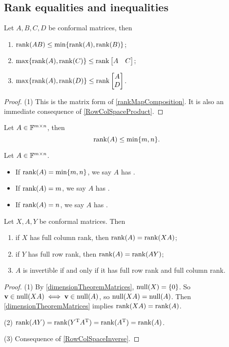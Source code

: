 \subsection{Rank equalities and inequalities}
\begin{proposition} \label{rankMultiplication}
Let $A,B,C,D$ be conformal matrices, then
\begin{enumerate}
\item $\operatorname{rank}(AB) \leq \min\{\operatorname{rank}(A),\operatorname{rank}(B)\}$;
\item $\max\{\operatorname{rank}(A),\operatorname{rank}(C)\} \leq \operatorname{rank} \begin{bmatrix}
A & C
\end{bmatrix}$;
\item $\max\{\operatorname{rank}(A),\operatorname{rank}(D)\} \leq \operatorname{rank} \begin{bmatrix}
A \\ D
\end{bmatrix}$.
\end{enumerate}
\end{proposition}
\begin{proof}
(1) This is the matrix form of \ref{rankMapComposition}. It is also an immediate consequence of \ref{RowColSpaceProduct}.
\end{proof}

\begin{lemma}
Let $A\in\mathbb{F}^{m\times n}$, then
\[ \operatorname{rank}(A) \leq \min\{m,n\}. \]
\end{lemma}
\begin{definition}
Let $A\in\mathbb{F}^{m\times n}$.
\begin{itemize}
\item If $\operatorname{rank}(A) = \min\{m,n\}$, we say $A$ has .
\item If $\operatorname{rank}(A) = m$, we say $A$ has .
\item If $\operatorname{rank}(A) = n$, we say $A$ has .
\end{itemize}
\end{definition}

\begin{lemma}
Let $X,A,Y$ be conformal matrices. Then
\begin{enumerate}
\item if $X$ has full column rank, then $\operatorname{rank}(A) = \operatorname{rank}(XA)$;
\item if $Y$ has full row rank, then $\operatorname{rank}(A) = \operatorname{rank}(AY)$;
\item $A$ is invertible \textup{if and only if} it has full row rank and full column rank.
\end{enumerate}
\end{lemma}
\begin{proof}
(1) By \ref{dimensionTheoremMatrices}, $\operatorname{null}(X) = \{0\}$. So $\boldsymbol{\mathrm{v}}\in\operatorname{null}(XA) \iff \boldsymbol{\mathrm{v}}\in\operatorname{null}(A)$, so $\operatorname{null}(XA) = \operatorname{null}(A)$. Then \ref{dimensionTheoremMatrices} implies $\operatorname{rank}(XA) = \operatorname{rank}(A)$.

(2) $\operatorname{rank}(AY) = \operatorname{rank}(Y^{\mathrm{T}} A^{\mathrm{T}}) = \operatorname{rank}(A^{\mathrm{T}}) = \operatorname{rank}(A)$.

(3) Consequence of \ref{RowColSpaceInverse}.
\end{proof}

